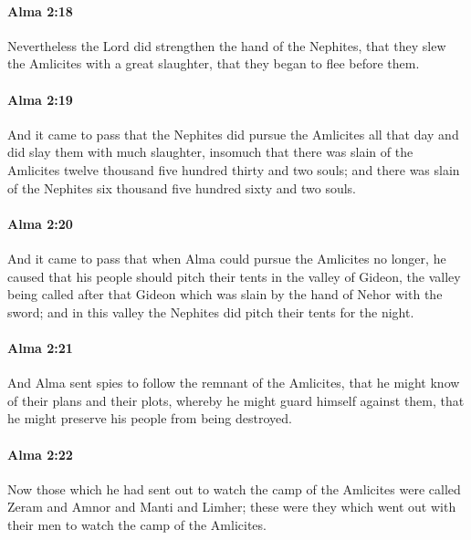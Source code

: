 		\paragraph{Alma 2:18} %
			\label{ALMA-2-18}

			Nevertheless the Lord did strengthen the hand of the Nephites,
			that they slew the Amlicites with a great slaughter,
			that they began to flee before them.

		\paragraph{Alma 2:19} %
			\label{ALMA-2-19}

			And it came to pass that the Nephites did pursue the Amlicites all that day
			and did slay them with much slaughter,
			insomuch that there was slain of the Amlicites
			twelve thousand five hundred thirty and two souls;
			and there was slain of the Nephites
			six thousand five hundred sixty and two souls.

		\paragraph{Alma 2:20} %
			\label{ALMA-2-20}

			And it came to pass that when Alma could pursue the Amlicites no longer,
			he caused that his people should pitch their tents in the valley of Gideon,
			the valley being called after that Gideon
			which was slain by the hand of Nehor with the sword;
			and in this valley the Nephites did pitch their tents for the night.

		\paragraph{Alma 2:21} %
			\label{ALMA-2-21}

			And Alma sent spies to follow the remnant of the Amlicites,
			that he might know of their plans and their plots,
			whereby he might guard himself against them,
			that he might preserve his people from being destroyed.

		\paragraph{Alma 2:22} %
			\label{ALMA-2-22}

			Now those which he had sent out to watch the camp of the Amlicites
			were called Zeram and Amnor and Manti and Limher;
			these were they which went out with their men
			to watch the camp of the Amlicites.

